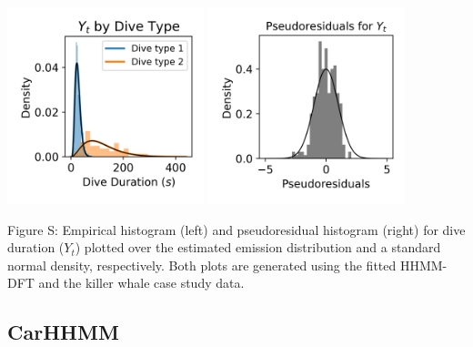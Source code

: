 \documentclass{article}
\begin{document}
        \begin{center}
        \includegraphics[width=2.25in]{../Plots/2019/20190902-182840-CATs_OB_1_0_267_HHMM_empirical_hist_dive_duration.png}
        \includegraphics[width=2.25in]{../Plots/2019/20190902-182840-CATs_OB_1_0_267_HHMM_pseudresids_Dive_Duration.png}
        \end{center}
        
        \noindent Figure S: Empirical histogram (left) and pseudoresidual histogram (right) for dive duration ($Y_{t}$) plotted over the estimated emission distribution and a standard normal density, respectively. Both plots are generated using the fitted HHMM-DFT and the killer whale case study data.
        \addtocounter{fignum}{1}
        
        \subsection{CarHHMM}
        
\end{document}
